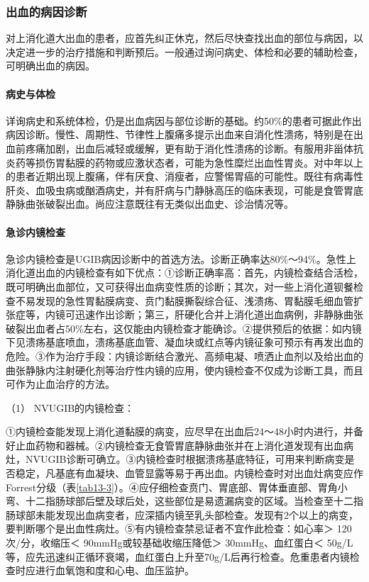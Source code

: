 \subsubsection{出血的病因诊断}

对上消化道大出血的患者，应首先纠正休克，然后尽快查找出血的部位与病因，以决定进一步的治疗措施和判断预后。一般通过询问病史、体检和必要的辅助检查，可明确出血的病因。

\paragraph{病史与体检}

详询病史和系统体检，仍是出血病因与部位诊断的基础。约50\%的患者可据此作出病因诊断。慢性、周期性、节律性上腹痛多提示出血来自消化性溃疡，特别是在出血前疼痛加剧，出血后减轻或缓解，更有助于消化性溃疡的诊断。有服用非甾体抗炎药等损伤胃黏膜的药物或应激状态者，可能为急性糜烂出血性胃炎。对中年以上的患者近期出现上腹痛，伴有厌食、消瘦者，应警惕胃癌的可能性。既往有病毒性肝炎、血吸虫病或酗酒病史，并有肝病与门静脉高压的临床表现，可能是食管胃底静脉曲张破裂出血。尚应注意既往有无类似出血史、诊治情况等。

\paragraph{急诊内镜检查}

急诊内镜检查是UGIB病因诊断中的首选方法。诊断正确率达80\%～94\%。急性上消化道出血的内镜检查有如下优点：①诊断正确率高：首先，内镜检查结合活检，既可明确出血部位，又可获得出血病变性质的诊断；其次，对一些上消化道钡餐检查不易发现的急性胃黏膜病变、贲门黏膜撕裂综合征、浅溃疡、胃黏膜毛细血管扩张症等，内镜可迅速作出诊断；第三，肝硬化合并上消化道出血病例，非静脉曲张破裂出血者占50\%左右，这仅能由内镜检查才能确诊。②提供预后的依据：如内镜下见溃疡基底喷血，溃疡基底血管、凝血块或红点等内镜征象可预示有再发出血的危险。③作为治疗手段：内镜诊断结合激光、高频电凝、喷洒止血剂以及给出血的曲张静脉内注射硬化剂等治疗性内镜的应用，使内镜检查不仅成为诊断工具，而且可作为止血治疗的方法。

\hypertarget{text00032.htmlux5cux23CHP1-13-1-4-4-2-1}{}
（1） NVUGIB的内镜检查：

①内镜检查能发现上消化道黏膜的病变，应尽早在出血后24～48小时内进行，并备好止血药物和器械。②内镜检查无食管胃底静脉曲张并在上消化道发现有出血病灶，NVUGIB诊断可确立。③内镜检查时根据溃疡基底特征，可用来判断病变是否稳定，凡基底有血凝块、血管显露等易于再出血。内镜检查时对出血灶病变应作Forrest分级（表\ref{tab13-3}）。④应仔细检查贲门、胃底部、胃体垂直部、胃角小弯、十二指肠球部后壁及球后处，这些部位是易遗漏病变的区域。当检查至十二指肠球部未能发现出血病变者，应深插内镜至乳头部检查。发现有2个以上的病变，要判断哪个是出血性病灶。⑤有内镜检查禁忌证者不宜作此检查：如心率＞
120次/分，收缩压＜ 90mmHg或较基础收缩压降低＞ 30mmHg、血红蛋白＜
50g/L等，应先迅速纠正循环衰竭，血红蛋白上升至70g/L后再行检查。危重患者内镜检查时应进行血氧饱和度和心电、血压监护。

